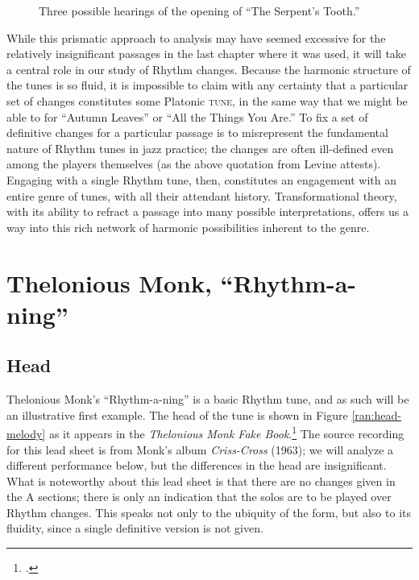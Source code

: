 \begin{figure}[tbp]
  \caption{Three possible hearings of the opening of ``The Serpent's Tooth.''}
  \label{rcg:serpents-ambiguous}
\end{figure}

While this prismatic approach to analysis may have seemed excessive for the
relatively insignificant passages in the last chapter where it was used, it
will take a central role in our study of Rhythm changes. Because the harmonic
structure of the tunes is so fluid, it is impossible to claim with any
certainty that a particular set of changes constitutes some Platonic
\textsc{tune}, in the same way that we might be able to for ``Autumn Leaves''
or ``All the Things You Are.'' To fix a set of definitive changes for a
particular passage is to misrepresent the fundamental nature of Rhythm tunes
in jazz practice; the changes are often ill-defined even among the players
themselves (as the above quotation from Levine attests). Engaging
with a single Rhythm tune, then, constitutes an engagement with an entire
genre of tunes, with all their attendant history. Transformational
theory, with its ability to refract a passage into many possible
interpretations, offers us a way into this rich network of harmonic
possibilities inherent to the genre.

\section{Thelonious Monk, “Rhythm-a-ning”}
\label{sec:rhythm-a-ning}

\subsection{Head}

Thelonious Monk's ``Rhythm-a-ning'' is a basic Rhythm tune, and as such will
be an illustrative first example. The head of the tune is shown in Figure
\ref{ran:head-melody} as it appears in the \emph{Thelonious Monk Fake
  Book}.\footcite[]{sickler:fakebook} The source recording for this lead sheet
is from Monk's album \emph{Criss-Cross} (1963); we will analyze a different
performance below, but the differences in the head are
insignificant.\nocite{monk:crisscross} What is noteworthy about this lead
sheet is that there are no changes given in the A sections; there is only an
indication that the solos are to be played over Rhythm changes. This
speaks not only to the ubiquity of the form, but also to its fluidity, since a
single definitive version is not given.

